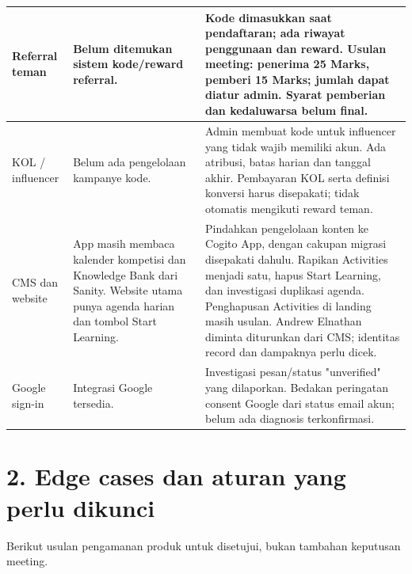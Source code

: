 \documentclass[10pt,a4paper]{article}
\begin{document}
{\begin{longtable}{L{30.70mm}L{56.55mm}L{74.32mm}}
Referral teman & Belum ditemukan sistem kode/\allowbreak{}reward referral. & Kode dimasukkan saat pendaftaran; ada riwayat penggunaan dan reward. Usulan meeting: penerima 25 Marks, pemberi 15 Marks; jumlah dapat diatur admin. Syarat pemberian dan kedaluwarsa belum final. \\ \hline
KOL /\allowbreak{} influencer & Belum ada pengelolaan kampanye kode. & Admin membuat kode untuk influencer yang tidak wajib memiliki akun. Ada atribusi, batas harian dan tanggal akhir. Pembayaran KOL serta definisi konversi harus disepakati; tidak otomatis mengikuti reward teman. \\ \hline
CMS dan website & App masih membaca kalender kompetisi dan Knowledge Bank dari Sanity. Website utama punya agenda harian dan tombol Start Learning. & Pindahkan pengelolaan konten ke Cogito App, dengan cakupan migrasi disepakati dahulu. Rapikan Activities menjadi satu, hapus Start Learning, dan investigasi duplikasi agenda. Penghapusan Activities di landing masih usulan. Andrew Elnathan diminta diturunkan dari CMS; identitas record dan dampaknya perlu dicek. \\ \hline
Google sign-in & Integrasi Google tersedia. & Investigasi pesan/\allowbreak{}status "unverified" yang dilaporkan. Bedakan peringatan consent Google dari status email akun; belum ada diagnosis terkonfirmasi. \\ \hline
\end{longtable}
}

\section*{2. Edge cases dan aturan yang perlu dikunci}

Berikut usulan pengamanan produk untuk disetujui, bukan tambahan keputusan meeting.
\end{document}
